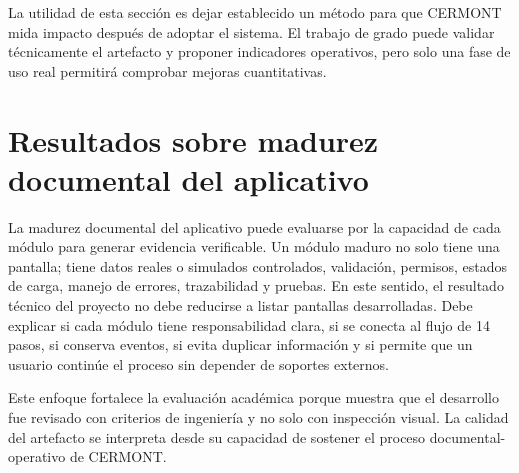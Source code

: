 La utilidad de esta sección es dejar establecido un método para que CERMONT mida impacto después de adoptar el sistema. El trabajo de grado puede validar técnicamente el artefacto y proponer indicadores operativos, pero solo una fase de uso real permitirá comprobar mejoras cuantitativas.

\section{Resultados sobre madurez documental del aplicativo}
\label{sec:resultados-madurez-documental}

La madurez documental del aplicativo puede evaluarse por la capacidad de cada módulo para generar evidencia verificable. Un módulo maduro no solo tiene una pantalla; tiene datos reales o simulados controlados, validación, permisos, estados de carga, manejo de errores, trazabilidad y pruebas. En este sentido, el resultado técnico del proyecto no debe reducirse a listar pantallas desarrolladas. Debe explicar si cada módulo tiene responsabilidad clara, si se conecta al flujo de 14 pasos, si conserva eventos, si evita duplicar información y si permite que un usuario continúe el proceso sin depender de soportes externos.

Este enfoque fortalece la evaluación académica porque muestra que el desarrollo fue revisado con criterios de ingeniería y no solo con inspección visual. La calidad del artefacto se interpreta desde su capacidad de sostener el proceso documental-operativo de CERMONT.
